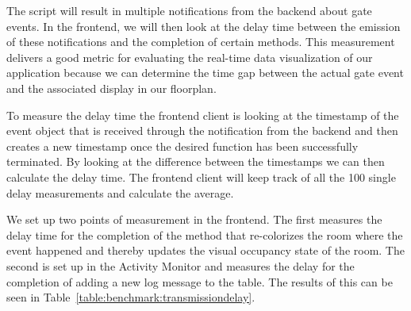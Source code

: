 The script will result in multiple notifications from the backend about gate events. In the frontend, we will then look at the delay time between the emission of these notifications and the completion of certain methods. This measurement delivers a good metric for evaluating the real-time data visualization of our application because we can determine the time gap between the actual gate event and the associated display in our floorplan.

To measure the delay time the frontend client is looking at the timestamp of the event object that is received through the notification from the backend and then creates a new timestamp once the desired function has been successfully terminated. By looking at the difference between the timestamps we can then calculate the delay time. The frontend client will keep track of all the 100 single delay measurements and calculate the average. 

We set up two points of measurement in the frontend. The first measures the delay time for the completion of the method that re-colorizes the room where the event happened and thereby updates the visual occupancy state of the room. The second is set up in the Activity Monitor and measures the delay for the completion of adding a new log message to the table.
The results of this can be seen in Table~\ref{table:benchmark:transmissiondelay}.

